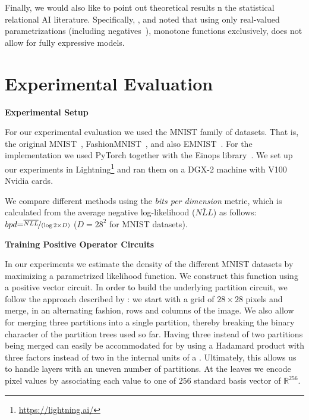 Finally, we would also like to point out theoretical results n the statistical relational AI literature. Specifically, \citet{buchman2017rules}, and \citet{kuzelka2020complex} noted that using only real-valued parametrizations (including negatives~\citep{buchman2017negative}), \ie monotone functions exclusively, does not allow for fully expressive models.



































\section{Experimental Evaluation}
\label{sec:experiments}


\textbf{Experimental Setup}


For our experimental evaluation we used the MNIST family of datasets. That is, the original MNIST~\citep{deng2012mnist}, FashionMNIST~\citep{xiao2017fashion}, and also EMNIST~\citep{cohen2017emnist}.
For the implementation we used PyTorch together with the Einops library~\citep{rogozhnikov2022einops}. We set up our experiments in Lightning\footnote{\url{https://lightning.ai/}} and ran them on a DGX-2 machine with V100 Nvidia cards.

We compare different methods using the \textit{bits per dimension} metric, which is calculated from the average negative log-likelihood ($\overline{NLL}$) as follows: $bpd {=} \nicefrac{\overline{NLL}}{(\log{2} \times D)}$ ($D{=}28^2$ for MNIST datasets).



\textbf{Training Positive Operator Circuits}

In our experiments we estimate the density of the different MNIST datasets by maximizing a parametrized likelihood function. We construct this  function using a positive vector circuit.
In order to build the underlying partition circuit,
we follow the approach described by \citet{zuidberg2024probabilistic}: we start with a grid of $28\times 28$ pixels and merge, in an alternating fashion, rows and columns of the image.
We also allow for merging three partitions into  a single partition, thereby breaking the binary character of the partition trees used so far.
Having three instead of two partitions being merged can easily be accommodated for by using a Hadamard product with three factors instead of two in the internal units of a \pvc. Ultimately, this allows us to handle layers with an uneven number of partitions.
At the leaves we encode pixel values by associating each value to one of $256$ standard basis vector of $\mathbb{R}^{256}$.

